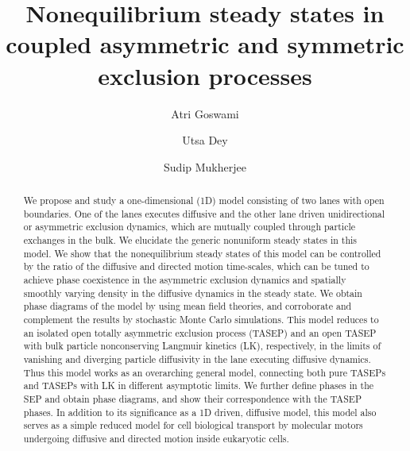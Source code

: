 \documentclass[aps,pre,twocolumn,superscriptaddress,amsmath,amssymb,longbibliography,floatfix]{revtex4}
\begin{document}
 
\title{Nonequilibrium steady states in coupled asymmetric and symmetric exclusion processes}
\author{Atri Goswami}
\author{Utsa Dey}
\author{Sudip Mukherjee}

\begin{abstract}
We propose and study a one-dimensional (1D) model consisting of two lanes with open boundaries. One of the lanes executes diffusive
and the other lane driven unidirectional or asymmetric exclusion dynamics, which are mutually coupled through particle exchanges in the bulk. We elucidate the generic nonuniform steady states in this model. We show that the 
nonequilibrium steady states of this model can be controlled by the ratio
of the diffusive and directed motion time-scales, which can be
tuned to achieve phase coexistence in the asymmetric exclusion dynamics and
spatially smoothly varying density in the diffusive dynamics
in the steady state. We obtain phase diagrams of the model by using mean field
theories,  and corroborate and complement the results by stochastic Monte Carlo simulations. This model reduces to an isolated open totally asymmetric exclusion process (TASEP) and an open TASEP with bulk particle nonconserving Langmuir kinetics (LK), respectively, in the limits of vanishing and diverging particle diffusivity in the lane executing diffusive dynamics. Thus this model works as an overarching general model, connecting  both pure TASEPs and TASEPs with LK in different asymptotic limits.  %
We further define phases in the SEP and obtain phase diagrams, and show their correspondence with the TASEP phases.
In addition to its significance as a 1D driven, diffusive model, this model also serves as a simple reduced model for cell biological transport
by molecular motors undergoing diffusive and directed motion inside eukaryotic cells.
\end{abstract}
\end{document}
